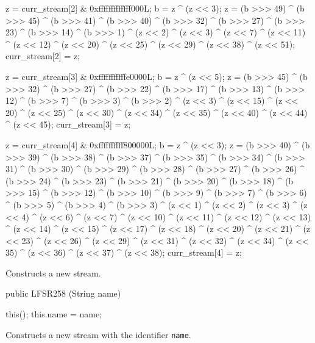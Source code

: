 \begin{code}
\begin{hide}
{        z = curr_stream[2] & 0xfffffffffffff000L;
        b = z ^ (z << 3);
        z = (b >>> 49) ^ (b >>> 45) ^ (b >>> 41) ^ (b >>> 40) ^ (b >>> 32) ^
            (b >>> 27) ^ (b >>> 23) ^ (b >>> 14) ^ (b >>> 1) ^ (z << 2) ^
            (z << 3) ^ (z << 7) ^ (z << 11) ^ (z << 12) ^ (z << 20) ^
            (z << 25) ^ (z << 29) ^ (z << 38) ^ (z << 51);
        curr_stream[2] = z;



        z = curr_stream[3] & 0xfffffffffffe0000L;
        b = z ^ (z << 5);
        z = (b >>> 45) ^ (b >>> 32) ^ (b >>> 27) ^ (b >>> 22) ^ (b >>> 17) ^
            (b >>> 13) ^ (b >>> 12) ^ (b >>> 7) ^ (b >>> 3) ^ (b >>> 2) ^
            (z << 3) ^ (z << 15) ^ (z << 20) ^ (z << 25) ^ (z << 30) ^
            (z << 34) ^ (z << 35) ^ (z << 40) ^ (z << 44) ^ (z << 45);
        curr_stream[3] = z;


        z = curr_stream[4] & 0xffffffffff800000L;
        b = z ^ (z << 3);
        z = (b >>> 40) ^ (b >>> 39) ^ (b >>> 38) ^ (b >>> 37) ^ (b >>> 35) ^
            (b >>> 34) ^ (b >>> 31) ^ (b >>> 30) ^ (b >>> 29) ^ (b >>> 28) ^
            (b >>> 27) ^ (b >>> 26) ^ (b >>> 24) ^ (b >>> 23) ^ (b >>> 21) ^
            (b >>> 20) ^ (b >>> 18) ^ (b >>> 15) ^ (b >>> 12) ^ (b >>> 10) ^
            (b >>> 9) ^ (b >>> 7) ^ (b >>> 6) ^ (b >>> 5) ^ (b >>> 4) ^
            (b >>> 3) ^ (z << 1) ^ (z << 2) ^ (z << 3) ^ (z << 4) ^ (z << 6) ^
            (z << 7) ^ (z << 10) ^ (z << 11) ^ (z << 12) ^ (z << 13) ^
            (z << 14) ^ (z << 15) ^ (z << 17) ^ (z << 18) ^ (z << 20) ^
            (z << 21) ^ (z << 23) ^ (z << 26) ^ (z << 29) ^ (z << 31) ^
            (z << 32) ^ (z << 34) ^ (z << 35) ^ (z << 36) ^ (z << 37) ^
            (z << 38);
        curr_stream[4] = z;

    }\end{hide}
\end{code}
\begin{tabb} Constructs a new stream.
\end{tabb}
\begin{code}

    public LFSR258 (String name) \begin{hide} {
        this();
        this.name = name;
    }\end{hide}
\end{code}
\begin{tabb} Constructs a new stream with the identifier \texttt{name}.
\end{tabb}
\begin{htmlonly}
\end{htmlonly}




